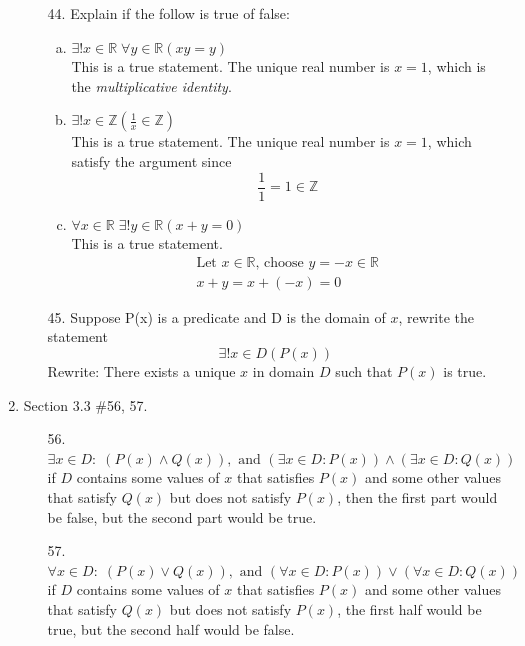 \documentclass[12pt]{article}
\newcommand{\Z}{\mathbb{Z}}
\newcommand{\R}{\mathbb{R}}
\newcommand{\paren}[1]{\left( #1 \right)}
\begin{document}
\begin{enumerate}
\begin{enumerate}
                \item[44.] Explain if the follow is true of false:
                    \begin{enumerate}[a.]
                        \item $\exists ! x \in \R \; \forall y \in \R \paren{xy=y}$\\
                        This is a true statement. The unique real number is $x=1$, which is the \textit{multiplicative identity}.
                        \item $\exists ! x \in \Z \paren{ \frac{1}{x} \in \Z}$\\
                        This is a true statement. The unique real number is $x=1$, which satisfy the argument since 
                        \[
                        \frac{1}{1} = 1 \in \Z
                        \]
                        \item $\forall x \in \R \; \exists ! y \in \R \paren{x+y=0}$\\
                        This is a true statement. 
                        \begin{align*}
                            \text{Let $x \in \R$, choose $y=-x\in \R$}\\
                            x+y = x + (-x) = 0
                        \end{align*}
                    \end{enumerate}
                \item[45.] Suppose P(x) is a predicate and D is the domain of $x$, rewrite the statement \[
                \exists ! x \in D \paren{P(x)}\]
                Rewrite:
                There exists a unique $x$ in domain $D$ such that $P(x)$ is true.
               
                
            \end{enumerate}
                
        \newpage
        \item Section 3.3 \#56, 57.
            \begin{enumerate}
                \item[56.] \(\exists x \in D :\; (P(x) \wedge Q(x)), \text{ and } (\exists x \in D: P(x)) \wedge (\exists x \in D: Q(x))\)\\
                if $D$ contains some values of $x$ that satisfies $P(x)$ and some other values that satisfy $Q(x)$ but does not satisfy $P(x)$, then the first part would be false, but the second part would be true.
                \item[57.] \(\forall x \in D: \; (P(x) \vee Q(x)), \text{ and } (\forall x \in D: P(x)) \vee (\forall x \in D: Q(x))\)\\
                if $D$ contains some values of $x$ that satisfies $P(x)$ and some other values that satisfy $Q(x)$ but does not satisfy $P(x)$, the first half would be true, but the second half would be false. 
            \end{enumerate}




\end{enumerate}
\end{document}
